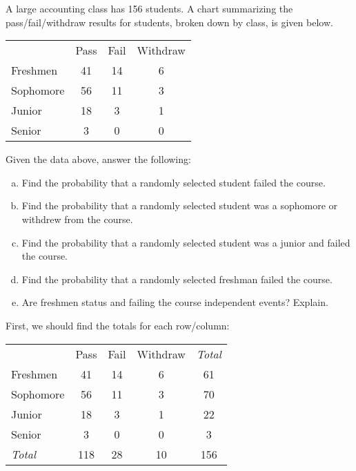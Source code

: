 \documentclass[11pt,letterpaper]{article}
\begin{document}
 A large accounting class has 156 students. A chart summarizing the pass/fail/withdraw results for students, broken down by class, is given below. \par
	\begin{table}[H]
	\centering
	\begin{tabular}{lccc}
	& Pass & Fail & Withdraw \\ \cline{2-4} 
	\multicolumn{1}{l|}{Freshmen} & \multicolumn{1}{c|}{41} & \multicolumn{1}{c|}{14} & \multicolumn{1}{c|}{6} \\ \cline{2-4} 
	\multicolumn{1}{l|}{Sophomore} & \multicolumn{1}{c|}{56} & \multicolumn{1}{c|}{11} & \multicolumn{1}{c|}{3} \\ \cline{2-4} 
	\multicolumn{1}{l|}{Junior} & \multicolumn{1}{c|}{18} & \multicolumn{1}{c|}{3} & \multicolumn{1}{c|}{1} \\ \cline{2-4} 
	\multicolumn{1}{l|}{Senior} & \multicolumn{1}{c|}{3} & \multicolumn{1}{c|}{0} & \multicolumn{1}{c|}{0} \\ \cline{2-4} 
	\end{tabular}
	\end{table} \pspace
Given the data above, answer the following:
	\begin{enumerate}[(a)]
	\item Find the probability that a randomly selected student failed the course.
	\item Find the probability that a randomly selected student was a sophomore or withdrew from the course.
	\item Find the probability that a randomly selected student was a junior and failed the course.
	\item Find the probability that a randomly selected freshman failed the course.
	\item Are freshmen status and failing the course independent events? Explain. 
	\end{enumerate} \pspace

\sol First, we should find the totals for each row/column:
	\begin{table}[H]
	\centering
	\begin{tabular}{lcccc}
	& Pass & Fail & Withdraw & {\itshape Total} \\ \cline{2-4} 
	\multicolumn{1}{l|}{Freshmen} & \multicolumn{1}{c|}{41} & \multicolumn{1}{c|}{14} & \multicolumn{1}{c|}{6} & 61 \\ \cline{2-4} 
	\multicolumn{1}{l|}{Sophomore} & \multicolumn{1}{c|}{56} & \multicolumn{1}{c|}{11} & \multicolumn{1}{c|}{3} & 70 \\ \cline{2-4} 
	\multicolumn{1}{l|}{Junior} & \multicolumn{1}{c|}{18} & \multicolumn{1}{c|}{3} & \multicolumn{1}{c|}{1} & 22 \\ \cline{2-4} 
	\multicolumn{1}{l|}{Senior} & \multicolumn{1}{c|}{3} & \multicolumn{1}{c|}{0} & \multicolumn{1}{c|}{0} & 3 \\ \cline{2-4}
	{\itshape Total} & 118 & 28 & 10 & 156
	\end{tabular}
	\end{table}
\end{document}
